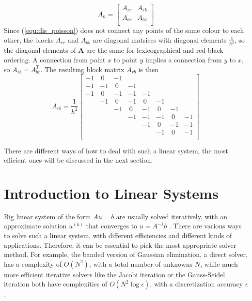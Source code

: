 \begin{equation}
A_h = 
\begin{bmatrix}
A_{rr} & A_{rb}\\
A_{br} & A_{bb}\\
\end{bmatrix}
\end{equation}
Since (\ref{equ:dis_poisson}) does not connect any points of the same colour to each other, the blocks $A_{rr}$ and $A_{bb}$ are diagonal matrices with diagonal elements $\frac{4}{h^2}$, so the diagonal elements of \textbf{A} are the same for lexicographical and red-black ordering. A connection from point $x$ to point $y$ implies a connection from $y$ to $x$, so  $A_{rb} = A_{br}^T$. The resulting block matrix $A_{rb}$ is then
\begin{equation}
A_{rb} = \frac{1}{h^2} 
\begin{bmatrix}
-1 & ~0 & -1 & & & &  & \\
-1 & -1 & ~0 & -1 & & &   & \\
-1 & ~0 & -1 & -1 & -1 &   & \\
   & -1 & ~0 & -1 & ~0 & -1 &    \\
   
   & & -1 & ~0 & -1 & ~0 & -1     \\
   & & & -1 & -1 & -1 & ~0 & -1     \\
     & & & & -1 & ~0 & -1 & -1   \\
       & & & &  & -1 & ~0 & -1  \\
\end{bmatrix}
\end{equation}
 
There are different ways of how to deal with such a linear system, the most efficient ones will be discussed in the next section.

\section{Introduction to Linear Systems}
Big linear system of the form $Au = b$ are usually solved iteratively, with an approximate solution $u^{(k)}$ that converges to $u = A^{-1}b$ \cite{golub1996matrix}. There are various ways to solve such a linear system, with different efficiencies and different kinds of applications. Therefore, it can be essential to pick the most appropriate solver method. For example, the banded version of Gaussian elimination, a direct solver, has a complexity of $O(N^2)$, with a total number of unknowns $N$, while much more efficient iterative solvers like the Jacobi iteration or the Gauss-Seidel iteration both have complexities of $O(N^2 \log \epsilon)$, with a discretization accuracy $\epsilon$ \cite{Trottenberg:2000:MUL:374106}. 

